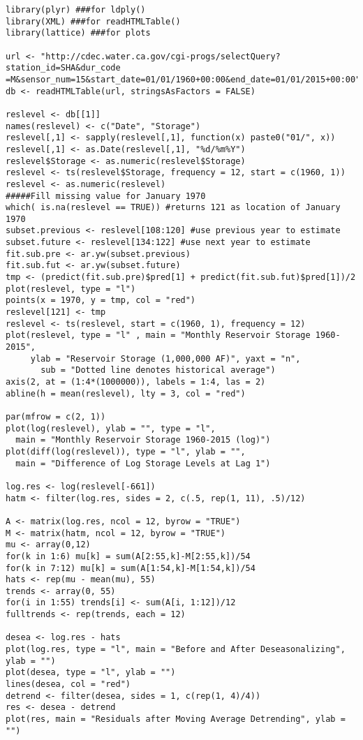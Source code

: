 \documentclass[twoside,12pt]{article}
\begin{document}
\begin{verbatim}
library(plyr) ###for ldply()
library(XML) ###for readHTMLTable()
library(lattice) ###for plots

url <- "http://cdec.water.ca.gov/cgi-progs/selectQuery?station_id=SHA&dur_code
=M&sensor_num=15&start_date=01/01/1960+00:00&end_date=01/01/2015+00:00"
db <- readHTMLTable(url, stringsAsFactors = FALSE)

reslevel <- db[[1]]
names(reslevel) <- c("Date", "Storage")
reslevel[,1] <- sapply(reslevel[,1], function(x) paste0("01/", x))
reslevel[,1] <- as.Date(reslevel[,1], "%d/%m%Y")
reslevel$Storage <- as.numeric(reslevel$Storage)
reslevel <- ts(reslevel$Storage, frequency = 12, start = c(1960, 1))
reslevel <- as.numeric(reslevel)
#####Fill missing value for January 1970
which( is.na(reslevel == TRUE)) #returns 121 as location of January 1970
subset.previous <- reslevel[108:120] #use previous year to estimate
subset.future <- reslevel[134:122] #use next year to estimate
fit.sub.pre <- ar.yw(subset.previous)
fit.sub.fut <- ar.yw(subset.future)
tmp <- (predict(fit.sub.pre)$pred[1] + predict(fit.sub.fut)$pred[1])/2
plot(reslevel, type = "l")
points(x = 1970, y = tmp, col = "red")
reslevel[121] <- tmp
reslevel <- ts(reslevel, start = c(1960, 1), frequency = 12)
plot(reslevel, type = "l" , main = "Monthly Reservoir Storage 1960-2015", 
     ylab = "Reservoir Storage (1,000,000 AF)", yaxt = "n",
       sub = "Dotted line denotes historical average")
axis(2, at = (1:4*(1000000)), labels = 1:4, las = 2)
abline(h = mean(reslevel), lty = 3, col = "red")

par(mfrow = c(2, 1))
plot(log(reslevel), ylab = "", type = "l",
  main = "Monthly Reservoir Storage 1960-2015 (log)")
plot(diff(log(reslevel)), type = "l", ylab = "",
  main = "Difference of Log Storage Levels at Lag 1")

log.res <- log(reslevel[-661])
hatm <- filter(log.res, sides = 2, c(.5, rep(1, 11), .5)/12)

A <- matrix(log.res, ncol = 12, byrow = "TRUE")
M <- matrix(hatm, ncol = 12, byrow = "TRUE")
mu <- array(0,12)
for(k in 1:6) mu[k] = sum(A[2:55,k]-M[2:55,k])/54
for(k in 7:12) mu[k] = sum(A[1:54,k]-M[1:54,k])/54
hats <- rep(mu - mean(mu), 55)
trends <- array(0, 55)
for(i in 1:55) trends[i] <- sum(A[i, 1:12])/12
fulltrends <- rep(trends, each = 12)

desea <- log.res - hats
plot(log.res, type = "l", main = "Before and After Deseasonalizing", ylab = "")
plot(desea, type = "l", ylab = "")
lines(desea, col = "red")
detrend <- filter(desea, sides = 1, c(rep(1, 4)/4))
res <- desea - detrend
plot(res, main = "Residuals after Moving Average Detrending", ylab = "")


\end{verbatim}
\end{document}
